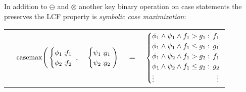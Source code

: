 In addition to $\ominus$ and $\otimes$ another key binary operation on case
statements the preserves the LCF property is \emph{symbolic case maximization}:
\vspace{-7mm}
{\footnotesize
\begin{center}
\begin{tabular}{r c c c l}
&
\hspace{-7mm} $\casemax \Bigg(
  \begin{cases}
    \phi_1: \hspace{-2mm} & \hspace{-2mm} f_1 \\ 
    \phi_2: \hspace{-2mm} & \hspace{-2mm} f_2 \\ 
  \end{cases}$
$,$
&
\hspace{-4mm}
  $\begin{cases}
    \psi_1: \hspace{-2mm} & \hspace{-2mm} g_1 \\ 
    \psi_2: \hspace{-2mm} & \hspace{-2mm} g_2 \\ 
  \end{cases} \Bigg)$
&
\hspace{-4mm} 
$ = $
&
\hspace{-4mm}
  $\begin{cases}
  \phi_1 \wedge \psi_1 \wedge f_1 > g_1    : & \hspace{-2mm} f_1 \\ 
  \phi_1 \wedge \psi_1 \wedge f_1 \leq g_1 : & \hspace{-2mm} g_1 \\ 
  \phi_1 \wedge \psi_2 \wedge f_1 > g_2    : & \hspace{-2mm}f_1 \\ 
  \phi_1 \wedge \psi_2 \wedge f_1 \leq g_2 : & \hspace{-2mm} g_2 \\ 
 \vdots & \vdots
  \end{cases}$
\end{tabular}
\end{center}
} \vspace{-1mm}

